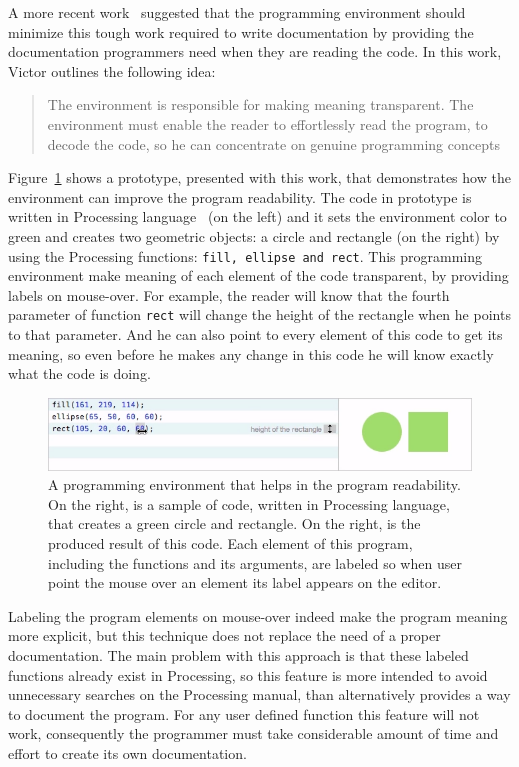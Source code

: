 A more recent work~\citep{learnableProg} suggested that the programming environment should minimize this tough work required to write documentation by providing the documentation programmers need when they are reading the code. In this work, Victor outlines the following idea:

\blockquote{The environment is responsible for making meaning transparent. The environment must enable the reader to effortlessly read the program, to decode the code, so he can concentrate on genuine programming concepts~\citep{learnableProg}}

Figure~\ref{fig:victor-ex} shows a prototype, presented with this work, that demonstrates how the environment can improve the program readability. The code in prototype is written in Processing language~\citep{Reas2006} (on the left) and it  sets the environment color to green and creates two geometric objects: a circle and rectangle (on the right) by using the Processing functions: \texttt{fill, ellipse and rect}. This programming environment make meaning of each element of the code transparent, by providing labels on mouse-over. For example, the reader will know that the fourth parameter of function \texttt{rect} will change the height of the rectangle when he points to that parameter. And he can also point to every element of this code to get its meaning, so even before he makes any change in this code he will know exactly what the code is doing.     

\begin{figure}[!htbp]
  \centering
  \includegraphics[width=.7\textwidth]{images/victor-example}
    \caption{A programming environment that helps in the program readability. On the right, is a sample of code, written in Processing language, that creates a green circle and rectangle. On the right, is the produced result of this code. Each element of this program, including the functions and its arguments, are labeled so when user point the mouse over an element its label appears on the editor.}
  \label{fig:victor-ex}
\end{figure}

Labeling the program elements on mouse-over indeed make the program meaning more explicit, but this technique does not replace the need of a proper documentation. The main problem with this approach is that these labeled functions already exist in Processing, so this feature is more intended to avoid unnecessary searches on the Processing manual, than alternatively provides a way to document the program. For any user defined function this feature will not work, consequently the programmer must take considerable amount of time and effort to create its own documentation.

